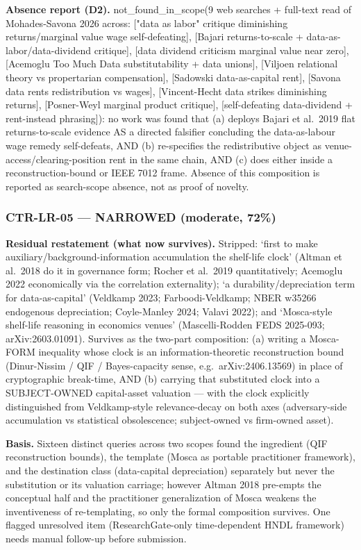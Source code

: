 \documentclass[
  11pt,
]{article}
\begin{document}
\textbf{Absence report (D2).} not\_found\_in\_scope(9 web searches +
full-text read of Mohades-Savona 2026 across: {[}"data as labor"
critique diminishing returns/marginal value wage self-defeating{]},
{[}Bajari returns-to-scale + data-as-labor/data-dividend critique{]},
{[}data dividend criticism marginal value near zero{]}, {[}Acemoglu Too
Much Data substitutability + data unions{]}, {[}Viljoen relational
theory vs propertarian compensation{]}, {[}Sadowski data-as-capital
rent{]}, {[}Savona data rents redistribution vs wages{]},
{[}Vincent-Hecht data strikes diminishing returns{]}, {[}Posner-Weyl
marginal product critique{]}, {[}self-defeating data-dividend +
rent-instead phrasing{]}): no work was found that (a) deploys Bajari et
al.~2019 flat returns-to-scale evidence AS a directed falsifier
concluding the data-as-labour wage remedy self-defeats, AND (b)
re-specifies the redistributive object as venue-access/clearing-position
rent in the same chain, AND (c) does either inside a
reconstruction-bound or IEEE 7012 frame. Absence of this composition is
reported as search-scope absence, not as proof of novelty.

\subsubsection{CTR-LR-05 --- NARROWED (moderate,
72\%)}\label{ctr-lr-05-narrowed-moderate-72}

\textbf{Residual restatement (what now survives).} Stripped: `first to
make auxiliary/background-information accumulation the shelf-life clock'
(Altman et al.~2018 do it in governance form; Rocher et al.~2019
quantitatively; Acemoglu 2022 economically via the correlation
externality); `a durability/depreciation term for data-as-capital'
(Veldkamp 2023; Farboodi-Veldkamp; NBER w35266 endogenous depreciation;
Coyle-Manley 2024; Valavi 2022); and `Mosca-style shelf-life reasoning
in economics venues' (Mascelli-Rodden FEDS 2025-093; arXiv:2603.01091).
Survives as the two-part composition: (a) writing a Mosca-FORM
inequality whose clock is an information-theoretic reconstruction bound
(Dinur-Nissim / QIF / Bayes-capacity sense, e.g.~arXiv:2406.13569) in
place of cryptographic break-time, AND (b) carrying that substituted
clock into a SUBJECT-OWNED capital-asset valuation --- with the clock
explicitly distinguished from Veldkamp-style relevance-decay on both
axes (adversary-side accumulation vs statistical obsolescence;
subject-owned vs firm-owned asset).

\textbf{Basis.} Sixteen distinct queries across two scopes found the
ingredient (QIF reconstruction bounds), the template (Mosca as portable
practitioner framework), and the destination class (data-capital
depreciation) separately but never the substitution or its valuation
carriage; however Altman 2018 pre-empts the conceptual half and the
practitioner generalization of Mosca weakens the inventiveness of
re-templating, so only the formal composition survives. One flagged
unresolved item (ResearchGate-only time-dependent HNDL framework) needs
manual follow-up before submission.
\end{document}

